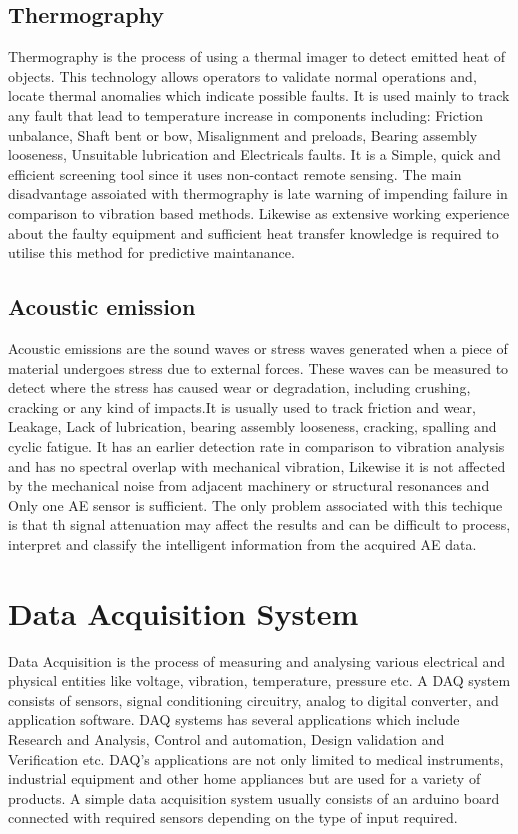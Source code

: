 \subsection{Thermography }

Thermography is the process of using a thermal imager to detect emitted heat of objects. This technology allows operators to validate normal operations and, locate thermal anomalies which indicate possible faults.
It is used mainly to track any fault that lead to temperature increase in components including: Friction unbalance, Shaft bent or bow, Misalignment and preloads, Bearing assembly looseness, Unsuitable lubrication and Electricals faults. 
It is a Simple, quick and efficient screening tool since it uses non-contact remote sensing. The main disadvantage assoiated with thermography is late warning of impending failure in comparison to vibration based methods. Likewise as extensive working experience about the faulty equipment and sufficient heat transfer knowledge is required to utilise this method for predictive maintanance.

\subsection{Acoustic emission}

Acoustic emissions are the sound waves or stress waves generated when a piece of material undergoes stress due to external forces. These waves can be measured to detect where the stress has caused wear or degradation, including crushing, cracking or any kind of impacts.It is usually used
 to track friction and wear, Leakage, Lack of lubrication, bearing assembly looseness, cracking, spalling and cyclic fatigue.
It has an earlier detection rate in comparison to vibration analysis and has no spectral overlap with mechanical vibration, Likewise it is not affected by the mechanical noise from adjacent machinery or structural resonances and Only one AE sensor is sufficient. 
The only problem associated with this techique is that th signal attenuation may affect the results and can be difficult to process, interpret and classify the intelligent information from the acquired AE data.



\section{Data Acquisition System}\label{DAQ}
Data Acquisition is the process of measuring and analysing various electrical and physical entities like voltage, vibration, temperature, pressure etc. A DAQ system consists of sensors, signal conditioning circuitry, analog to digital converter, and application software. DAQ systems has several applications which include Research and Analysis, Control and automation, Design validation and Verification etc. DAQ's applications are not only limited to medical instruments, industrial equipment and other home appliances but are used for a variety of products.
A simple  data acquisition system usually consists of an arduino board connected with required sensors depending on the type of input required.

